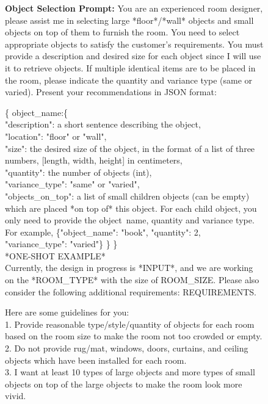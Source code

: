 \begin{figure}[!t]
    \centering
    \begin{center}
    
    \begin{tcolorbox} [top=2pt,bottom=2pt, width=\linewidth, boxrule=1pt]
    {\footnotesize {\selectfont
    \textbf{Object Selection Prompt:}
    You are an experienced room designer, please assist me in selecting large *floor*/*wall* objects and small objects on top of them to furnish the room. You need to select appropriate objects to satisfy the customer's requirements.
    You must provide a description and desired size for each object since I will use it to retrieve objects. If multiple identical items are to be placed in the room, please indicate the quantity and variance type (same or varied).
    Present your recommendations in JSON format:

    \{ 
        object\_name:\{ \\
            "description": a short sentence describing the object, \\
            "location": "floor" or "wall", \\
            "size": the desired size of the object, in the format of a list of three numbers, [length, width, height] in centimeters, \\
            "quantity": the number of objects (int), \\
            "variance\_type": "same" or "varied", \\
            "objects\_on\_top": a list of small children objects (can be empty) which are placed *on top of* this object. For each child object, you only need to provide the object\ name, quantity and variance type. For example, \{"object\_name": "book", "quantity": 2, "variance\_type": "varied"\}
        \}
    \} \\
    
    *ONE-SHOT EXAMPLE* \\
    
    Currently, the design in progress is *INPUT*, and we are working on the *ROOM\_TYPE* with the size of ROOM\_SIZE.
    Please also consider the following additional requirements: REQUIREMENTS.
    
    Here are some guidelines for you: \\
    1. Provide reasonable type/style/quantity of objects for each room based on the room size to make the room not too crowded or empty. \\
    2. Do not provide rug/mat, windows, doors, curtains, and ceiling objects which have been installed for each room. \\
    3. I want at least 10 types of large objects and more types of small objects on top of the large objects to make the room look more vivid. \\
    
}}
\end{tcolorbox}
\end{center}
\end{figure}
